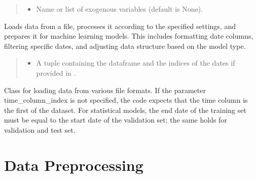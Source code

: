 \documentclass[letterpaper,10pt,english]{sphinxmanual}
\begin{document}
\begin{fulllineitems}
\begin{quote}
\begin{description}
\begin{itemize}
\item {} 
\sphinxAtStartPar
{} \textendash{} Name or list of exogenous variables (default is None).

\end{itemize}

\end{description}\end{quote}

\begin{fulllineitems}
\label{\detokenize{docs/data_loader:data_loader.DataLoader.load_data}}
\pysigstartsignatures
{}
\pysigstopsignatures
\sphinxAtStartPar
Loads data from a file, processes it according to the specified settings,
and prepares it for machine learning models. This includes formatting date columns,
filtering specific dates, and adjusting data structure based on the model type.
\begin{quote}\begin{description}
\sphinxAtStartPar
\begin{itemize}
\item {} 
\sphinxAtStartPar
A tuple containing the dataframe and the indices of the dates if provided in .

\end{itemize}


\end{description}\end{quote}

\end{fulllineitems}


\end{fulllineitems}


\sphinxAtStartPar
Class for loading data from various file formats. If the parameter \textendash{}time\_column\_index is not specified,
the code expects that the time column is the first of the dataset.
For statistical models, the end date of the training set must be equal to the start date of the validation set;
the same holds for validation and test set.

\sphinxstepscope


\section{Data Preprocessing}
\label{\detokenize{docs/data_preprocessing:data-preprocessing}}\label{\detokenize{docs/data_preprocessing::doc}}\label{\detokenize{docs/data_preprocessing:module-data_preprocessing}}
\end{document}
